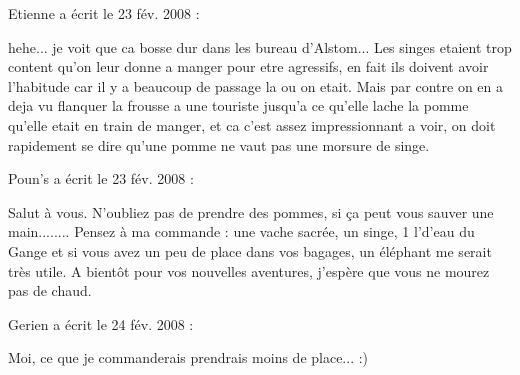 \medskip
Etienne a écrit le 23 fév. 2008 :
\begin{displayquote}
hehe... je voit que ca bosse dur dans les bureau d'Alstom...
Les singes etaient trop content qu'on leur donne a manger pour etre agressifs, en fait ils doivent avoir l'habitude car il y a beaucoup de passage la ou on etait. Mais par contre on en a deja vu flanquer la frousse a une touriste jusqu'a ce qu'elle lache la pomme qu'elle etait en train de manger, et ca c'est assez impressionnant a voir, on doit rapidement se dire qu'une pomme ne vaut pas une morsure de singe.
\end{displayquote}

\medskip
Poun's a écrit le 23 fév. 2008 :
\begin{displayquote}
Salut à vous. N'oubliez pas de prendre des pommes, si ça peut vous sauver une main........
Pensez à ma commande : une vache sacrée, un singe, 1 l'd'eau du Gange et si vous avez un peu de place dans vos bagages, un éléphant me serait très utile.
A bientôt pour vos nouvelles aventures, j'espère que vous ne mourez pas de chaud.
\end{displayquote}

\medskip
Gerien a écrit le 24 fév. 2008 :
\begin{displayquote}
Moi, ce que je commanderais prendrais moins de place...
:)
\end{displayquote}
